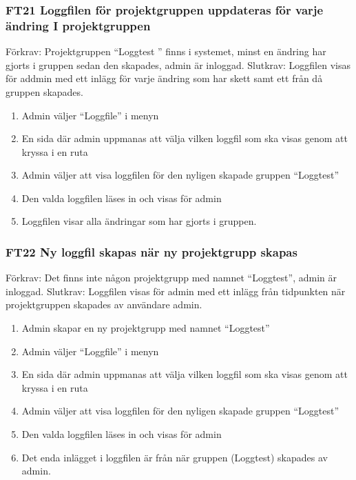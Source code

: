 \documentclass[paper=a4, fontsize=11pt,twoside]{article}
\begin{document}
		\subsubsection*{ FT21  Loggfilen för projektgruppen uppdateras för varje
		ändring I projektgruppen}

		Förkrav:  Projektgruppen “Loggtest ” finns i systemet, minst en ändring har
		gjorts i gruppen sedan den skapades, admin är inloggad.
		\newline
		Slutkrav: Loggfilen visas för addmin med ett inlägg för varje ändring som har skett samt ett från då gruppen skapades.
		
		\begin{enumerate}
		  \item     Admin väljer “Loggfile” i menyn
		  \item         En sida där admin uppmanas att välja vilken loggfil som ska visas genom att kryssa i en ruta
		  \item         Admin väljer att visa loggfilen för den nyligen skapade gruppen “Loggtest”
		  \item         Den valda loggfilen läses in och visas för admin
		  \item          Loggfilen visar alla ändringar som har gjorts i gruppen.
		  
		\end{enumerate}
		
		
		
		\subsubsection*{ FT22  Ny loggfil skapas när ny projektgrupp skapas}
		
		Förkrav: Det finns inte någon projektgrupp med namnet “Loggtest”, admin är
		inloggad.
		\newline
		Slutkrav:  Loggfilen visas för admin med ett inlägg från tidpunkten
		när projektgruppen skapades av användare admin.
		
		\begin{enumerate}
		  \item       Admin skapar en ny projektgrupp med namnet “Loggtest”
		  \item       Admin väljer “Loggfile” i menyn
		  \item       En sida där admin uppmanas att välja vilken loggfil som ska visas genom att kryssa i en ruta
		  \item       Admin väljer att visa loggfilen för den nyligen skapade gruppen “Loggtest”
		  \item       Den valda loggfilen läses in och visas för admin
		  \item       Det enda inlägget i loggfilen är från när
		  gruppen (Loggtest) skapades av admin.
		  
		\end{enumerate}
		
		
\end{document}
